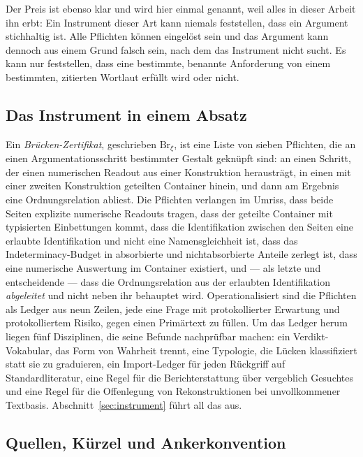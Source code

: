 \documentclass[11pt,a4paper]{article}
\theoremstyle{definition}
\newcommand{\Brxi}{\mathrm{Br}_{\xi}}
\begin{document}
Der Preis ist ebenso klar und wird hier einmal genannt, weil alles in dieser
Arbeit ihn erbt: Ein Instrument dieser Art kann niemals feststellen, dass ein
Argument stichhaltig ist. Alle Pflichten können eingelöst sein und das Argument
kann dennoch aus einem Grund falsch sein, nach dem das Instrument nicht sucht. Es
kann nur feststellen, dass eine bestimmte, benannte Anforderung von einem
bestimmten, zitierten Wortlaut erfüllt wird oder nicht.

\subsection{Das Instrument in einem Absatz}

Ein \emph{Brücken-Zertifikat}, geschrieben $\Brxi$, ist eine Liste von sieben
Pflichten, die an einen Argumentationsschritt bestimmter Gestalt geknüpft sind:
an einen Schritt, der einen numerischen Readout aus einer Konstruktion
heraus\-trägt, in einen mit einer zweiten Konstruktion geteilten Container hinein,
und dann am Ergebnis eine Ordnungsrelation abliest. Die Pflichten verlangen im
Umriss, dass beide Seiten explizite numerische Readouts tragen, dass der geteilte
Container mit typisierten Einbettungen kommt, dass die Identifikation zwischen
den Seiten eine erlaubte Identifikation und nicht eine Namensgleichheit ist, dass
das Indeterminacy-Budget in absorbierte und nichtabsorbierte Anteile zerlegt ist,
dass eine numerische Auswertung im Container existiert, und --- als letzte und
entscheidende --- dass die Ordnungsrelation aus der erlaubten Identifikation
\emph{abgeleitet} und nicht neben ihr behauptet wird. Operationalisiert sind die
Pflichten als Ledger aus neun Zeilen, jede eine Frage mit protokollierter
Erwartung und protokolliertem Risiko, gegen einen Primärtext zu füllen. Um das
Ledger herum liegen fünf Disziplinen, die seine Befunde nachprüfbar machen: ein
Verdikt-Vokabular, das Form von Wahrheit trennt, eine Typologie, die Lücken
klassifiziert statt sie zu graduieren, ein Import-Ledger für jeden Rückgriff auf
Standardliteratur, eine Regel für die Berichterstattung über vergeblich Gesuchtes
und eine Regel für die Offenlegung von Rekonstruktionen bei unvollkommener
Textbasis. Abschnitt~\ref{sec:instrument} führt all das aus.

\subsection{Quellen, Kürzel und Ankerkonvention}
\label{sec:sources}
\end{document}
